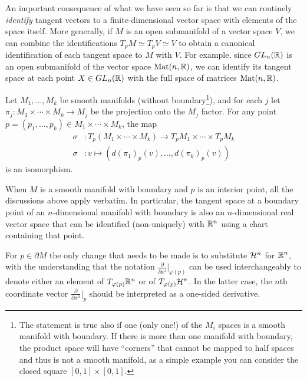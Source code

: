 An important consequence of what we have seen so far is that we can routinely \emph{identify} tangent vectors to a finite-dimensional vector space with elements of the space itself.
More generally, if $M$ is an open submanifold of a vector space $V$, we can combine the identifications $T_p M \simeq T_p V \simeq V$ to obtain a canonical identification of each tangent space to $M$ with $V$.
For example, since $GL_n(\mathbb{R})$ is an open submanifold of the vector space $\mathrm{Mat}(n, \mathbb{R})$, we can identify its tangent space at each point $X\in GL_n(\mathbb{R})$ with the full space of matrices $\mathrm{Mat}(n, \mathbb{R})$.

\begin{exercise}
	Let $M_1, \ldots, M_k$ be smooth manifolds (without boundary\footnote{The statement is true also if one (only one!) of the $M_i$ spaces is a smooth manifold with boundary. If there is more than one manifold with boundary, the product space will have ``corners'' that cannot be mapped to half spaces and thus is not a smooth manifold, as a simple example you can consider the closed square $[0,1]\times [0,1]$.}), and for each $j$ let $\pi_j:M_1\times\cdots\times M_k \to M_j$ be the projection onto the $M_j$ factor.
	For any point $p=(p_1,\ldots,p_k)\in M_1\times\cdots\times M_k$, the map
	\begin{align}
		\sigma & : T_p(M_1\times\cdots\times M_k) \to T_p M_1\times\cdots\times T_p M_k \\
		\sigma & : v \mapsto \left(d(\pi_1)_p(v), \ldots, d(\pi_k)_p(v)\right)
	\end{align}
	is an isomorphism.
\end{exercise}

\begin{remark}
	When $M$ is a smooth manifold with boundary and $p$ is an interior point, all the discussions above apply verbatim. In particular, the tangent space at a boundary point of an $n$-dimensional manifold with boundary is also an $n$-dimensional real vector space that can be identified (non-uniquely) with $\mathbb{R}^n$ using a chart containing that point.

	For $p\in\partial M$ the only change that needs to be made is to substitute $\mathcal{H}^n$ for $\mathbb{R}^n$, with the understanding that the notation $\frac{\partial}{\partial x^i}\big|_{\varphi(p)}$ can be used interchangeably to denote either an element of $T_{\varphi(p)}\mathbb{R}^n$ or of $T_{\varphi(p)}\mathcal{H}^n$. In the latter case, the $n$th coordinate vector $\frac{\partial}{\partial x^n}\big|_{p}$ should be interpreted as a one-sided derivative.
\end{remark}

